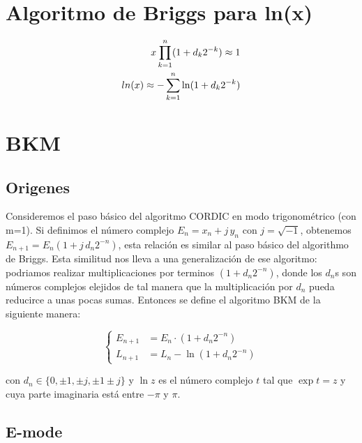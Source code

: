 \documentclass[10pt,a4paper]{book}
\begin{document}
\chapter{Algoritmo de Briggs para ln(x)}

\begin{equation} \label{eq:briggs_ln}
   \begin{subequations}
      \begin{aligned}
         x \prod_{k=1}^{n} (1+d_k 2^{-k}) \approx 1     \\
         ln(x) \approx - \sum_{k=1}^{n} \ln(1+d_k 2^{-k})
      \end{aligned}
   \end{subequations}
\end{equation}


\chapter{BKM}

   \section{Origenes}

   Consideremos el paso básico del algoritmo CORDIC en modo trigonométrico (con m=1).
   Si definimos el número complejo $E_n = x_n + j \, y_n$ con $j=\sqrt{-1}$, obtenemos $E_{n+1} = E_n (1+j \, d_n 2^{-n})$, esta relación es similar al paso básico del algorithmo de Briggs.
   Esta similitud nos lleva a una generalización de ese algoritmo: podriamos realizar multiplicaciones por terminos $(1+d_n 2^{-n})$, donde los $d_n$s son números complejos elejidos de tal manera que la multiplicación por $d_n$ pueda reducirce a unas pocas sumas.
   Entonces se define el algoritmo BKM de la siguiente manera:

\begin{equation} \label{eq:bkm_eqs}
   \left\{
      \begin{aligned}
         E_{n+1} &= E_n \cdot (1 + d_n 2^{-n})   \\
         L_{n+1} &= L_n - \ln(1 + d_n 2^{-n})
      \end{aligned}
   \right.
\end{equation}

   con $d_n \in \{ 0, \pm 1, \pm j, \pm 1 \pm j\}$ y $\ln z$ es el número complejo $t$ tal que $\exp{t} = z$ y cuya parte imaginaria está entre $-\pi$ y $\pi$.


\section{E-mode}
\end{document}
